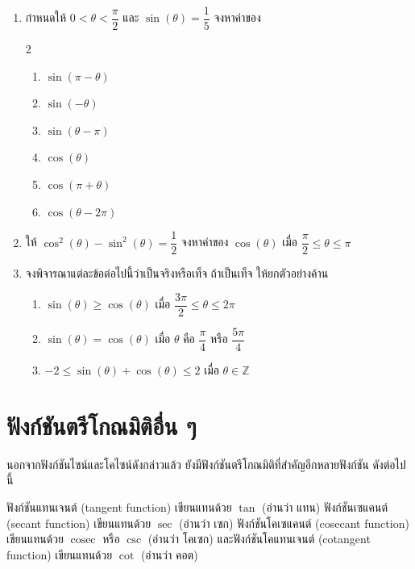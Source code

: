 \begin{enumerate}[label=\arabic*., leftmargin=*, itemsep=1em]
 \item กำหนดให้ $0 < \theta < \dfrac{\pi}{2}$ และ $\sin \left( \theta \right) = \dfrac{1}{5}$ จงหาค่าของ
 \begin{multicols}{2}
 	\begin{enumerate}[label=\theenumi\arabic*), leftmargin=1.5em, itemsep=0.6em]
 		\everymath{\displaystyle}
 		\item $\sin \left( \pi - \theta \right)$
 		\item $\sin \left( -\theta \right)$
 		\item $\sin \left( \theta - \pi \right)$
 		\item $\cos \left( \theta \right)$
 		\item $\cos \left( \pi + \theta \right)$
 		\item $\cos \left( \theta - 2\pi \right)$
 	\end{enumerate}
 \end{multicols}
 
 \item ให้ $\cos^{2} \left( \theta \right) - \sin^{2} \left( \theta \right) = \dfrac{1}{2}$ จงหาค่าของ $\cos \left( \theta \right)$ เมื่อ $\dfrac{\pi}{2} \leq \theta \leq \pi$
 
 \item จงพิจารณาแต่ละข้อต่อไปนี้ว่าเป็นจริงหรือเท็จ ถ้าเป็นเท็จ ให้ยกตัวอย่างค้าน
 \begin{enumerate}[label=\theenumi\arabic*), leftmargin=1.5em, itemsep=0.6em]
 	\everymath{\displaystyle}
 	\item $\sin \left( \theta \right) \geq \cos \left( \theta \right)$ เมื่อ $\dfrac{3\pi}{2} \leq \theta \leq 2\pi$
 	\item $\sin \left( \theta \right) = \cos \left( \theta \right)$ เมื่อ $\theta$ คือ $\dfrac{\pi}{4}$ หรือ $\dfrac{5\pi}{4}$
 	\item $-2 \leq \sin \left( \theta \right) + \cos \left( \theta \right) \leq 2$ เมื่อ $\theta \in \mathbb{Z}$
 \end{enumerate}
\end{enumerate}
\newpage

\section{ฟังก์ชันตรีโกณมิติอื่น ๆ}
นอกจากฟังก์ชันไซน์และโคไซน์ดังกล่าวแล้ว ยังมีฟังก์ชันตรีโกณมิติที่สำคัญอีกหลายฟังก์ชัน ดังต่อไปนี้

ฟังก์ชันแทนเจนต์ (tangent function) เขียนแทนด้วย $\tan$ (อ่านว่า แทน) ฟังก์ชันเซแคนต์ (secant function) เขียนแทนด้วย $\sec$ (อ่านว่า เซก) ฟังก์ชันโคเซแคนต์ (cosecant function) เขียนแทนด้วย $\operatorname{cosec}$ หรือ $\csc$ (อ่านว่า โคเซก) และฟังก์ชันโคแทนเจนต์ (cotangent function) เขียนแทนด้วย $\cot$ (อ่านว่า คอต)

